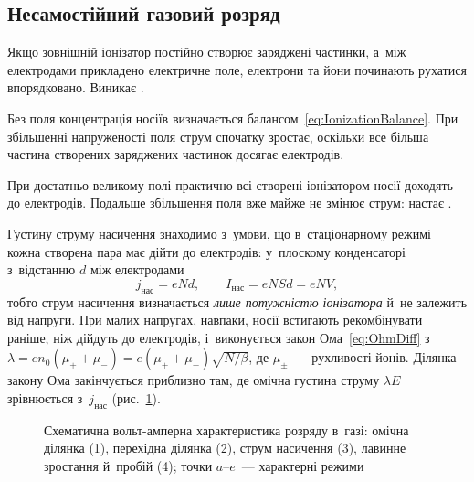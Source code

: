 \subsection*{Несамостійний газовий розряд}


Якщо зовнішній іонізатор постійно створює заряджені частинки, а~між електродами прикладено
електричне поле, електрони та йони починають рухатися впорядковано. Виникає
.

Без поля концентрація носіїв визначається балансом~\eqref{eq:IonizationBalance}. При
збільшенні напруженості поля струм спочатку зростає, оскільки все більша частина створених
заряджених частинок досягає електродів.

При достатньо великому полі практично всі створені іонізатором носії доходять до
електродів. Подальше збільшення поля вже майже не змінює струм: настає .

Густину струму насичення знаходимо з~умови, що в~стаціонарному режимі кожна створена пара
має дійти до електродів: у~плоскому конденсаторі з~відстанню $d$ між електродами
\begin{equation}\label{eq:SaturationCurrentDensity}
	j_{\text{нас}} = eNd, \qquad I_{\text{нас}} = eNSd = eNV,
\end{equation}
тобто струм насичення визначається \emph{лише потужністю іонізатора} й~не залежить від
напруги. При малих напругах, навпаки, носії встигають рекомбінувати раніше, ніж дійдуть до
електродів, і~виконується закон Ома~\eqref{eq:OhmDiff} з
$\lambda=en_0(\mu_++\mu_-)=e(\mu_++\mu_-)\sqrt{N/\beta}$, де $\mu_\pm$~--- рухливості
йонів. Ділянка закону Ома закінчується приблизно там, де омічна густина струму $\lambda E$
зрівнюється з~$j_{\text{нас}}$ (рис.~\ref{pic:GasIV}).

\begin{figure}[h!]\centering
	\caption{Схематична вольт-амперна характеристика розряду в~газі: омічна ділянка (1),
	перехідна ділянка (2), струм насичення (3), лавинне зростання й~пробій (4); точки
	$a$--$e$~--- характерні режими\label{pic:GasIV}}
\end{figure}

